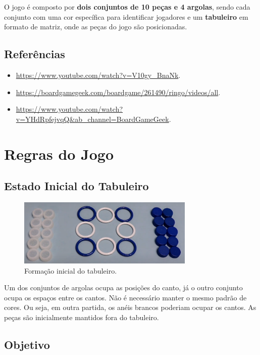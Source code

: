 \documentclass[12pt]{article}
\begin{document}
O jogo é composto por \textbf{dois conjuntos de 10 peças e 4 argolas}, sendo cada conjunto com uma cor específica para identificar jogadores e um \textbf{tabuleiro} em formato de matriz, onde as peças do jogo são posicionadas.
\subsection{Referências}
\begin{itemize}
    \item \url{https://www.youtube.com/watch?v=V10gy_BnaNk}.
    \item \url{https://boardgamegeek.com/boardgame/261490/ringo/videos/all}.
    \item \url{https://www.youtube.com/watch?v=YHdRpfejvqQ&ab_channel=BoardGameGeek}.

\end{itemize}

\section{Regras do Jogo}

\subsection{Estado Inicial do Tabuleiro}

\begin{figure}[H]
    \centering
    \includegraphics[width=0.75\textwidth]{ringo}
    \caption{Formação inicial do tabuleiro.}
    \label{fig:ringo}
\end{figure}

Um dos conjuntos de argolas ocupa as posições do canto, já o outro conjunto ocupa os espaços entre os cantos. Não é necessário manter o mesmo padrão de cores. Ou seja, em outra partida, os anéis brancos poderiam ocupar os cantos. As peças são inicialmente mantidos fora do tabuleiro.

\bigskip

\subsection{Objetivo}
\end{document}
